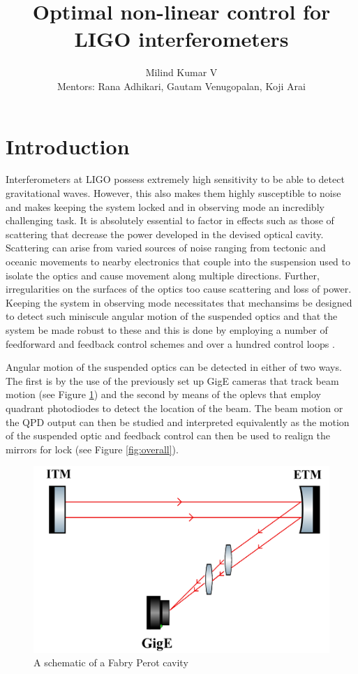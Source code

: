 \documentclass[colorlinks=true,pdfstartview=FitV,linkcolor=blue,
            citecolor=red,urlcolor=magenta]{ligodoc}
\title{Optimal non-linear control for LIGO interferometers}
\author{Milind Kumar V \\ Mentors: Rana Adhikari, Gautam Venugopalan, Koji Arai}
\begin{document}
\section{Introduction}\label{introduction}

Interferometers at LIGO possess extremely high sensitivity to be able to detect gravitational waves. However, this also makes them highly susceptible to noise and makes keeping the system locked and in observing mode an incredibly challenging task. It is absolutely essential to factor in effects such as those of scattering that decrease the power developed in the devised optical cavity. Scattering can arise from varied sources of noise ranging from tectonic and oceanic movements to nearby electronics that couple into the suspension used to isolate the optics and cause movement along multiple directions. Further, irregularities on the surfaces of the optics too cause scattering and loss of power. Keeping the system in observing mode necessitates that mechansims be designed to detect such miniscule angular motion of the suspended optics and that the system be made robust to these and this is done by employing a number of feedforward and feedback control schemes and over a hundred control loops \cite{adhikari2004sensitivity}.


Angular motion of the suspended optics can be detected in either of two ways. The first is by the use of the previously set up GigE cameras \cite{gige} that track beam motion (see Figure \ref{fig:gige}) and the second by means of the oplevs that employ quadrant photodiodes to detect the location of the beam. The beam motion or the QPD output can then be studied and interpreted equivalently as the motion of the suspended optic and feedback control can then be used to realign the mirrors for lock (see Figure \ref{fig:overall}).  

\begin{figure}[htbp]
\begin{center}
\includegraphics[width=.8\linewidth]{figures/gige.png}
\caption{A schematic of a Fabry Perot cavity}
\label{fig:gige}
\end{center}
\end{figure} 
\end{document}
